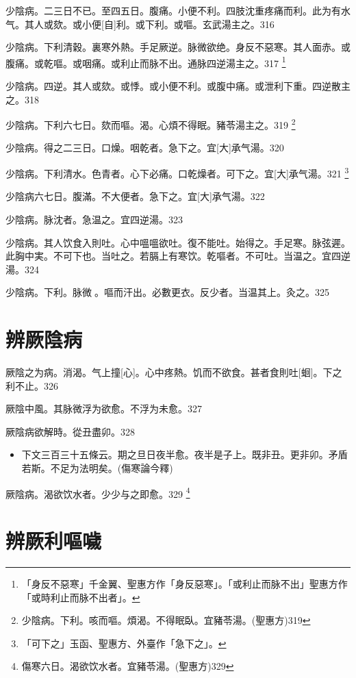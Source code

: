 \documentclass[oneside,b4paper]{ctexbook}
\begin{document}
\begin{flushleft}
少陰病。二三日不已。至四五日。腹痛。小便不利。四肢沈重疼痛而利。此为有水气。其人或欬。或小便[自]利。或下利。或嘔。玄武湯主之。316

少陰病。下利清穀。裏寒外熱。手足厥逆。脉微欲绝。身反不惡寒。其人面赤。或腹痛。或乾嘔。或咽痛。或利止而脉不出。通脉四逆湯主之。317
\footnote{「身反不惡寒」千金翼、聖惠方作「身反惡寒」。「或利止而脉不出」聖惠方作「或時利止而脉不出者」。}

少陰病。四逆。其人或欬。或悸。或小便不利。或腹中痛。或泄利下重。四逆散主之。318

少陰病。下利六七日。欬而嘔。渴。心煩不得眠。豬苓湯主之。319
\footnote{少陰病。下利。咳而嘔。煩渴。不得眠臥。宜豬苓湯。(聖惠方)319}

少陰病。得之二三日。口燥。咽乾者。急下之。宜[大]承气湯。320

少陰病。下利清水。色青者。心下必痛。口乾燥者。可下之。宜[大]承气湯。321
\footnote{「可下之」玉函、聖惠方、外臺作「急下之」。}

少陰病六七日。腹滿。不大便者。急下之。宜[大]承气湯。322

少陰病。脉沈者。急温之。宜四逆湯。323

少陰病。其人饮食入則吐。心中嗢嗢欲吐。復不能吐。始得之。手足寒。脉弦遲。此胸中実。不可下也。当吐之。若膈上有寒饮。乾嘔者。不可吐。当温之。宜四逆湯。324

少陰病。下利。脉微{𬈧}。嘔而汗出。必數更衣。反少者。当温其上。灸之。325

\chapter{辨厥陰病}

厥陰之为病。消渴。气上撞[心]。心中疼熱。饥而不欲食。甚者食則吐[蛔]。下之利不止。326

厥陰中風。其脉微浮为欲愈。不浮为未愈。327

厥陰病欲解時。從丑盡卯。328

\begin{itemize}
\item 下文三百三十五條云。期之旦日夜半愈。夜半是子上。既非丑。更非卯。矛盾若斯。不足为法明矣。(傷寒論今釋)
\end{itemize}

厥陰病。渴欲饮水者。少少与之即愈。329
\footnote{傷寒六日。渴欲饮水者。宜豬苓湯。(聖惠方)329}

\chapter{辨厥利嘔噦}


\end{flushleft}
\end{document}
